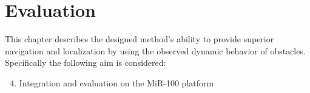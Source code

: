 \chapter{Evaluation}
This chapter describes the designed method's ability to provide superior navigation and localization by using the observed dynamic behavior of obstacles.
Specifically the following aim is considered:

\begin{enumerate}
    \setcounter{enumi}{3}
    \item Integration and evaluation on the MiR-100 platform
\end{enumerate}










